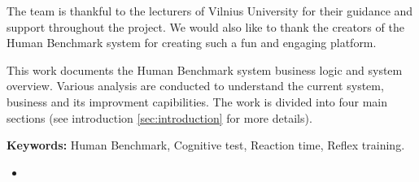 \documentclass[]{VUMIFTemplateClass}
\newcommand{\EE}{\mathbb{E}\,} %
\begin{document}

\onehalfspacing


The team is thankful to the lecturers of Vilnius University for their guidance and support throughout the project. We would also like to thank the creators of the Human Benchmark system for creating such a fun and engaging platform.



This work documents the Human Benchmark system business logic and system overview. Various analysis are conducted to understand the current system, business and its improvment capibilities. The work is divided into four main sections (see introduction \ref{sec:introduction} for more details).

\textbf{Keywords:} Human Benchmark, Cognitive test, Reaction time, Reflex training.





\singlespacing
{}

\listoffigures 

\listoftables

\tableofcontents
\onehalfspacing

\begin{itemize}
    \item 
\end{itemize}
\end{document}
